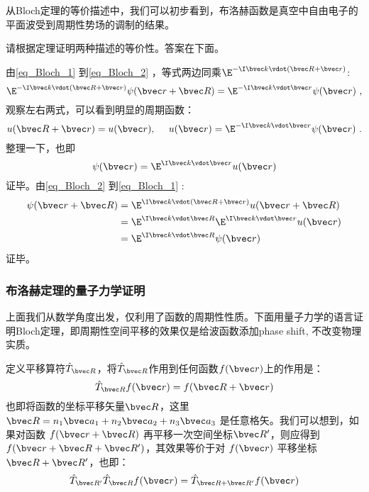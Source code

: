从Bloch定理的等价描述中，我们可以初步看到，布洛赫函数是真空中自由电子的平面波受到周期性势场的调制的结果。

\begin{exercise}{}
请根据定理证明两种描述的等价性。答案在下面。
\end{exercise}
由\autoref{eq_Bloch_1} 到\autoref{eq_Bloch_2} ，等式两边同乘$\E^{-\I \bvec k \vdot (\bvec R + \bvec r)}$:
\begin{equation}
\E^{-\I \bvec k \vdot (\bvec R + \bvec r)}\psi(\bvec r + \bvec R) = \E^{-\I \bvec k \vdot \bvec r}\psi(\bvec r)~,
\end{equation}
观察左右两式，可以看到明显的周期函数：
\begin{equation}
u(\bvec R + \bvec r) = u(\bvec r),~\quad u(\bvec r) = \E^{-\I \bvec k \vdot \bvec r}\psi(\bvec r)~.
\end{equation}
整理一下，也即
\begin{equation}
\psi(\bvec r) = \E^{\I \bvec k \vdot \bvec r} u(\bvec r)
\end{equation}
证毕。由\autoref{eq_Bloch_2} 到\autoref{eq_Bloch_1} :
\begin{align}
\psi(\bvec r + \bvec R) &= \E^{\I \bvec k \vdot (\bvec R + \bvec r)} u(\bvec r + \bvec R)\\
&= \E^{\I \bvec k \vdot \bvec R } \E^{\I \bvec k \vdot  \bvec r}u(\bvec r )\\ &= \E^{\I \bvec k \vdot \bvec R } \psi(\bvec r)
\end{align}
证毕。

\subsubsection{布洛赫定理的量子力学证明}
上面我们从数学角度出发，仅利用了函数的周期性性质。下面用量子力学的语言证明Bloch定理，即周期性空间平移的效果仅是给波函数添加phase shift, 不改变物理实质。

定义平移算符$\hat{T}_{\bvec R}$，将$\hat{T}_{\bvec R}$作用到任何函数$f(\bvec r)$上的作用是：
\begin{equation}
\hat{T}_{\bvec R} f(\bvec r) = f(\bvec R + \bvec r)
\end{equation}
也即将函数的坐标平移矢量$\bvec R$，这里$\bvec R = n_1 \bvec a_1 + n_2 \bvec a_2 + n_3 \bvec a_3 $ 是任意格矢。我们可以想到，如果对函数 $f(\bvec r + \bvec R)$ 再平移一次空间坐标$\bvec R'$，则应得到$f(\bvec r + \bvec R + \bvec R')$，其效果等价于对 $f(\bvec r)$ 平移坐标$\bvec R + \bvec R'$，也即：
\begin{equation}
\hat{T}_{\bvec R'}\hat{T}_{\bvec R} f(\bvec r) = \hat{T}_{\bvec R + \bvec R'}f(\bvec r )
\end{equation}

